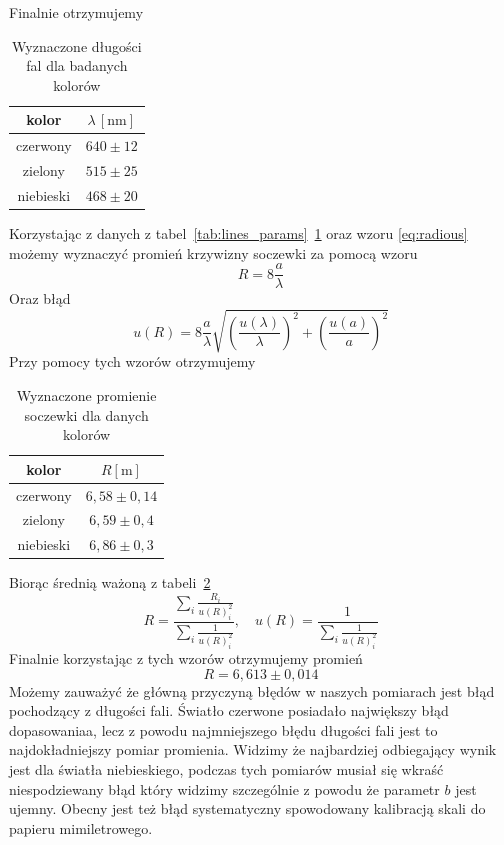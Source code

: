 \documentclass[12pt]{article}
\begin{document}
Finalnie otrzymujemy
\begin{table}[H]
	\centering
	\begin{tabular}{c|c}
		\toprule
		kolor     & \(\lambda \, [\mathrm{nm}]\) \\
		\midrule
		czerwony  & \(640 \pm 12\)               \\
		zielony   & \(515 \pm 25\)               \\
		niebieski & \(468 \pm 20\)               \\
		\bottomrule
	\end{tabular}
	\caption{Wyznaczone długości fal dla badanych kolorów}
	\label{tab:wavelength}
\end{table}

Korzystając z danych z tabel~\ref{tab:lines_params}~\ref{tab:wavelength} oraz wzoru \eqref{eq:radious} możemy wyznaczyć promień krzywizny soczewki za pomocą wzoru
\[
	R = 8\frac{a}{\lambda}
\]
Oraz błąd
\[
	u(R) = 8\frac{a}{\lambda} \sqrt{(\frac{u(\lambda)}{\lambda})^2 + (\frac{u(a)}{a})^2}
\]
Przy pomocy tych wzorów otrzymujemy

\begin{table}[H]
	\centering
	\begin{tabular}{c|c}
		\toprule
		kolor     & \(R [\mathrm{m}]\)    \\
		\midrule
		czerwony  & \(6{,}58 \pm 0{,}14\) \\
		zielony   & \(6{,}59 \pm 0{,}4\)  \\
		niebieski & \(6{,}86 \pm 0{,}3 \) \\
		\bottomrule
	\end{tabular}
	\caption{Wyznaczone promienie soczewki dla danych kolorów}
	\label{tab:radious}
\end{table}

Biorąc średnią ważoną z tabeli~\ref{tab:radious}
\[
	R = \frac{\sum_i \frac{R_i}{u(R)_i^2}}{\sum_i \frac{1}{u(R)_i^2}}, \quad u(R) = \frac{1}{\sum_i \frac{1}{u(R)_i^2}}
\]
Finalnie korzystając z tych wzorów otrzymujemy promień
\[
	R = 6{,}613 \pm 0{,}014
\]
Możemy zauważyć że główną przyczyną błędów w naszych pomiarach jest błąd pochodzący z długości fali. Światło czerwone posiadało największy błąd dopasowaniaa, lecz z powodu najmniejszego błędu długości fali jest to najdokładniejszy pomiar promienia. Widzimy że najbardziej odbiegający wynik jest dla światła niebieskiego, podczas tych pomiarów musiał się wkraść niespodziewany błąd który widzimy szczególnie z powodu że parametr \(b\) jest ujemny. Obecny jest też błąd systematyczny spowodowany kalibracją skali do papieru mimiletrowego.
\end{document}
